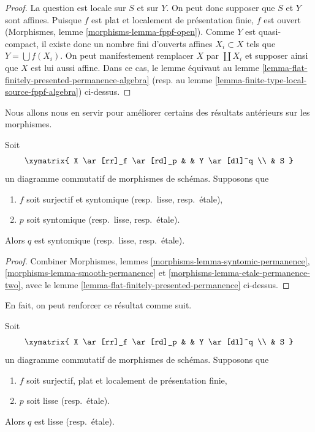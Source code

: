 \begin{proof}
La question est locale sur $S$ et sur $Y$. On peut donc supposer que $S$ et
$Y$ sont affines. Puisque $f$ est plat et localement de présentation finie,
$f$ est ouvert (Morphismes, lemme \ref{morphisms-lemma-fppf-open}).
Comme $Y$ est quasi-compact, il existe donc un nombre fini d'ouverts affines
$X_i \subset X$ tels que $Y = \bigcup f(X_i)$.
On peut manifestement remplacer $X$ par $\coprod X_i$ et supposer ainsi que
$X$ est lui aussi affine. Dans ce cas, le lemme équivaut au lemme
\ref{lemma-flat-finitely-presented-permanence-algebra}
(resp. au lemme \ref{lemma-finite-type-local-source-fppf-algebra}) ci-dessus.
\end{proof}

\noindent
Nous allons nous en servir pour améliorer certains des résultats antérieurs
sur les morphismes.

\begin{lemma}
\label{lemma-syntomic-smooth-etale-permanence}
Soit
$$
\xymatrix{
X \ar[rr]_f \ar[rd]_p & &
Y \ar[dl]^q \\
& S
}
$$
un diagramme commutatif de morphismes de schémas. Supposons que
\begin{enumerate}
\item $f$ soit surjectif et syntomique (resp.\ lisse, resp.\ \'etale),
\item $p$ soit syntomique (resp.\ lisse, resp.\ \'etale).
\end{enumerate}
Alors $q$ est syntomique (resp.\ lisse, resp.\ \'etale).
\end{lemma}

\begin{proof}
Combiner Morphismes, lemmes
\ref{morphisms-lemma-syntomic-permanence},
\ref{morphisms-lemma-smooth-permanence} et
\ref{morphisms-lemma-etale-permanence-two}, avec le lemme
\ref{lemma-flat-finitely-presented-permanence} ci-dessus.
\end{proof}

\noindent
En fait, on peut renforcer ce résultat comme suit.

\begin{lemma}
\label{lemma-smooth-permanence}
Soit
$$
\xymatrix{
X \ar[rr]_f \ar[rd]_p & &
Y \ar[dl]^q \\
& S
}
$$
un diagramme commutatif de morphismes de schémas. Supposons que
\begin{enumerate}
\item $f$ soit surjectif, plat et localement de présentation finie,
\item $p$ soit lisse (resp.\ \'etale).
\end{enumerate}
Alors $q$ est lisse (resp.\ \'etale).
\end{lemma}

